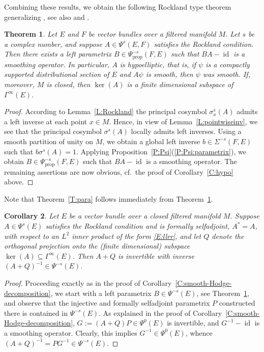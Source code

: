 \documentclass[reqno,12pt]{amsart}
\DeclareMathOperator{\id}{id}
\newcommand\prop{\textrm{prop}}
\newcommand\itemref[1]{(\ref{#1})}
\theoremstyle{plain}
\newtheorem{theorem}{Theorem}[section]
\newtheorem{corollary}[theorem]{Corollary}
\theoremstyle{definition}
\begin{document}
Combining these results, we obtain the following Rockland \cite{R78} type theorem generalizing \cite[Theorem~2.5(d)]{CGGP92}, see also \cite[Theorem~0.1]{HN79} and \cite[Theorem~3.3.10 and 5.4.1]{P08}.


\begin{theorem}\label{T:Rockland}
Let $E$ and $F$ be vector bundles over a filtered manifold $M$. 
Let $s$ be a complex number, and suppose $A\in\Psi^s(E,F)$ satisfies the Rockland condition.
Then there exists a left parametrix $B\in\Psi^{-s}_\prop(F,E)$ such that $BA-\id$ is a smoothing operator.
In particular, $A$ is hypoelliptic, that is, if $\psi$ is a compactly supported distributional section of $E$ and $A\psi$ is smooth, then $\psi$ was smooth.
If, moreover, $M$ is closed, then $\ker(A)$ is a finite dimensional subspace of\/ $\Gamma^\infty(E)$.
\end{theorem}


\begin{proof}
According to Lemma~\ref{L:Rockland} the principal cosymbol $\sigma^s_x(A)$ admits a left inverse at each point $x\in M$.
Hence, in view of Lemma~\ref{L:pointwiseinv}, we see that the principal cosymbol $\sigma^s(A)$ locally admits left inverses.
Using a smooth partition of unity on $M$, we obtain a global left inverse $b\in\Sigma^{-s}(F,E)$ such that $b\sigma^s(A)=1$.
Applying Proposition~\ref{P:Psi}\itemref{P:Psi:parametrix}, we obtain $B\in\Psi^{-s}_\prop(F,E)$ such that $BA-\id$ is a smoothing operator.
The remaining assertions are now obvious, cf.\ the proof of Corollary~\ref{C:hypo} above.
\end{proof}


Note that Theorem~\ref{T:para} follows immediately from Theorem~\ref{T:Rockland}.


\begin{corollary}\label{C:PsiinvA}
Let $E$ be a vector bundle over a closed filtered manifold $M$.
Suppose $A\in\Psi^s(E)$ satisfies the Rockland condition and is formally selfadjoint, $A^*=A$, with respect to an $L^2$ inner product of the form \eqref{E:llrr}, and let $Q$ denote the orthogonal projection onto the (finite dimensional) subspace $\ker(A)\subseteq\Gamma^\infty(E)$.
Then $A+Q$ is invertible with inverse $(A+Q)^{-1}\in\Psi^{-s}(E)$.
\end{corollary}


\begin{proof}
Proceeding exactly as in the proof of Corollary~\ref{C:smooth-Hodge-decomposition}, we start with a left parametrix $B\in\Psi^{-s}(E)$, see Theorem~\ref{T:Rockland}, and observe that the injective and formally selfadjoint parametrix $P$ constructed there is contained in $\Psi^{-s}(E)$.
As explained in the proof of Corollary~\ref{C:smooth-Hodge-decomposition}, $G:=(A+Q)P\in\Psi^0(E)$ is invertible, and $G^{-1}-\id$ is a smoothing operator.
Clearly, this implies $G^{-1}\in\Psi^0(E)$, whence $(A+Q)^{-1}=PG^{-1}\in\Psi^{-s}(E)$.
\end{proof}
\end{document}
